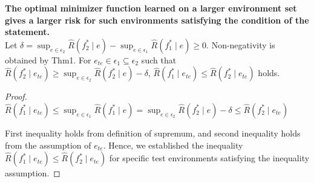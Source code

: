 \begin{theorem}\label{thm:env2}\textbf{The optimal minimizer function learned on a larger environment set gives a larger risk for such environments satisfying the condition of the statement.} \\
    Let $\delta = \sup_{e\in \epsilon_2} \hat{R}(f_2^*\mid e) - \sup_{e\in \epsilon_1} \hat{R}(f_1^*\mid e) \geq 0$. Non-negativity is obtained by Thm1. For $e_{te} \in \epsilon_1 \subseteq \epsilon_2$ such that $\hat{R}(f_2^* \mid e_{te}) \geq \sup_{e\in \epsilon_2} \hat{R}(f_2^* \mid e) - \delta$, $\hat{R}(f_1^* \mid e_{te}) \leq \hat{R}(f_2^* \mid e_{te})$ holds.
    \end{theorem}
    \begin{proof}
        $\hat{R}(f_1^* \mid e_{te}) \leq \sup_{e\in \epsilon_1} \hat{R}(f_1^* \mid e) = \sup_{e\in \epsilon_2} \hat{R}(f_2^*\mid e) - \delta \leq \hat{R}(f_2^*\mid e_{te})$
    
        First inequality holds from definition of supremum, and second inequality holds from the assumption of $e_{te}$. Hence, we established the inequality $\hat{R}(f_1^* \mid e_{te}) \leq \hat{R}(f_2^* \mid e_{te})$ for specific test environments satisfying the inequality assumption.
    \end{proof}
    